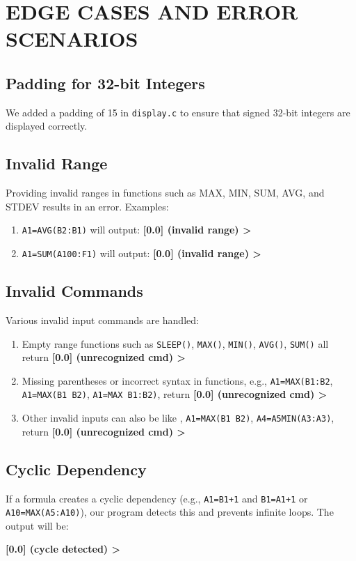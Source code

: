 \documentclass[a4paper]{article}
\begin{document}
\section{EDGE CASES AND ERROR SCENARIOS}

\subsection{Padding for 32-bit Integers}
We added a padding of 15 in \texttt{display.c} to ensure that signed 32-bit integers are displayed correctly.

\subsection{Invalid Range}
Providing invalid ranges in functions such as MAX, MIN, SUM, AVG, and STDEV results in an error. Examples:
\begin{enumerate}
    \item \texttt{A1=AVG(B2:B1)} will output: \textbf{[0.0] (invalid range) >}
    \item \texttt{A1=SUM(A100:F1)} will output: \textbf{[0.0] (invalid range) >}
\end{enumerate}

\subsection{Invalid Commands}
Various invalid input commands are handled:
\begin{enumerate}
    \item Empty range functions such as \texttt{SLEEP()}, \texttt{MAX()}, \texttt{MIN()}, \texttt{AVG()}, \texttt{SUM()} all return \textbf{[0.0] (unrecognized cmd) >}
    \item Missing parentheses or incorrect syntax in functions, e.g., \texttt{A1=MAX(B1:B2}, \texttt{A1=MAX(B1 B2)}, \texttt{A1=MAX B1:B2)}, return \textbf{[0.0] (unrecognized cmd) >}
    \item Other invalid inputs can also be like
    , \texttt{A1=MAX(B1 B2)}, \texttt{A4=A5MIN(A3:A3)}, return \textbf{[0.0] (unrecognized cmd) >}
\end{enumerate}

\subsection{Cyclic Dependency}
If a formula creates a cyclic dependency (e.g., \texttt{A1=B1+1} and \texttt{B1=A1+1} or \texttt{A10=MAX(A5:A10)}), our program detects this and prevents infinite loops. The output will be:
\begin{center}
    \textbf{[0.0] (cycle detected) >}
\end{center}
\end{document}
